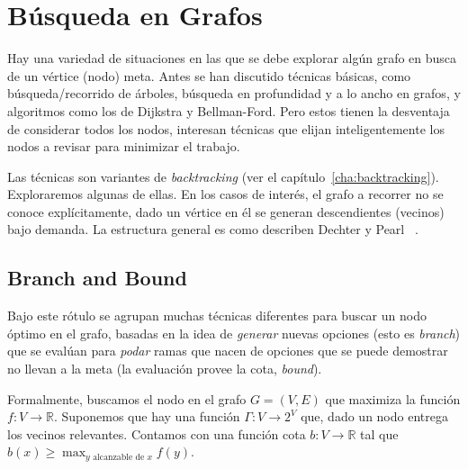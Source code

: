 

\chapter{Búsqueda en Grafos}
\label{cha:busqueda-en-grafos}

  Hay una variedad de situaciones en las que se debe explorar algún grafo
  en busca de un vértice (nodo) meta.
  Antes se han discutido técnicas básicas,
  como búsqueda/recorrido de árboles,
  búsqueda en profundidad y a lo ancho en grafos,
  y algoritmos como los de Dijkstra y Bellman-Ford.
  Pero estos tienen la desventaja de considerar todos los nodos,
  interesan técnicas que elijan inteligentemente los nodos a revisar
  para minimizar el trabajo.

  Las técnicas son variantes de \emph{\foreignlanguage{english}{backtracking}}
  (ver el capítulo~\ref{cha:backtracking}).
  Exploraremos algunas de ellas.
  En los casos de interés,
  el grafo a recorrer no se conoce explícitamente,
  dado un vértice en él se generan descendientes (vecinos) bajo demanda.
  La estructura general es como describen Dechter y Pearl~%
    \cite{dechter85:_gen_best_first_search}.

\section{Branch and Bound}
\label{seq:branch-and-bound}

  Bajo este rótulo se agrupan muchas técnicas diferentes
  para buscar un nodo óptimo en el grafo,
  basadas en la idea de \emph{generar} nuevas opciones
  (esto es \emph{\foreignlanguage{english}{branch}})
  que se evalúan para \emph{podar} ramas que nacen de opciones
  que se puede demostrar no llevan a la meta
  (la evaluación provee la cota,
   \emph{\foreignlanguage{english}{bound}}).

  Formalmente,
  buscamos el nodo en el grafo \(G = (V, E)\) que maximiza la función
  \(f \colon V \to \mathbb{R}\).
  Suponemos que hay una función \(\Gamma \colon V \to 2^V\)
  que,
  dado un nodo entrega los vecinos relevantes.
  Contamos con una función cota \(b \colon V \to \mathbb{R}\)
  tal que \(b(x) \ge \max_{y \text{\ alcanzable de\ } x} f(y)\).

